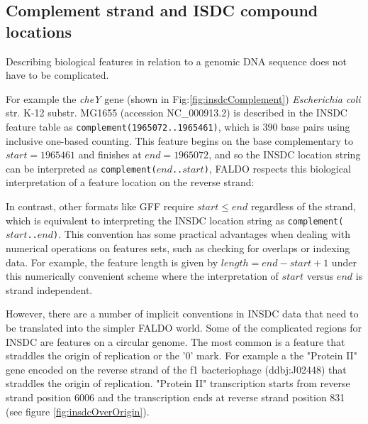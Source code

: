 \subsection*{Complement strand and ISDC compound locations}

Describing biological features in relation to a genomic DNA sequence does not have to be complicated.

For example the \textit{cheY} gene (shown in Fig:\ref{fig:insdcComplement}) 
\textit{Escherichia coli} str. K-12 substr. MG1655 (accession NC\_000913.2)
is described in the INSDC feature table as \texttt{complement(1965072..1965461)},
which is 390 base pairs using inclusive one-based counting.
This feature begins on the base complementary to $start = 1965461$
and finishes at $end = 1965072$, and so the INSDC location string
can be interpreted as \texttt{complement($end$..$start$)},
FALDO respects this biological interpretation of a feature location
on the reverse strand:

In contrast, other formats like GFF require $start \leq end$
regardless of the strand, which is equivalent to interpreting
the INSDC location string as \texttt{complement($start$..$end$)}.
This convention has some practical advantages when
dealing with numerical operations on features sets, such as
checking for overlaps or indexing data. For example, the
feature length is given by $length = end - start + 1$ under
this numerically convenient scheme where the interpretation
of $start$ versus $end$ is strand independent.

However, there are a number of implicit conventions in INSDC data that need to be translated into the simpler FALDO world.
Some of the complicated regions for INSDC are features on a circular genome. 
The most common is  a feature that straddles the origin of replication or the '0' mark.
For example a the "Protein II" gene encoded on the reverse strand of the f1 bacteriophage (ddbj:J02448) that straddles the origin of replication.
"Protein II" transcription starts from reverse strand position 6006 and the transcription ends at reverse strand position  831 (see figure \ref{fig:insdcOverOrigin}).



